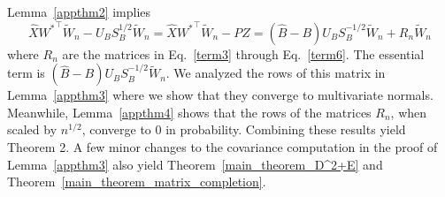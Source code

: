  Lemma~\ref{appthm2} implies
 $$\hat{X} {W^*}^{\top} \tilde{W}_n - U_B S_B^{1/2} \tilde{W}_n = \hat{X} {W^*}^{\top} \tilde{W}_n - PZ = (\hat{B} - B) U_B S_B^{-1/2} \tilde{W}_n + R_n \tilde{W}_n$$ where $R_n$ are the matrices in Eq.~\eqref{term3} through Eq.~\eqref{term6}. The essential term is $(\hat{B} - B) U_B S_B^{-1/2} \tilde{W}_n$. We analyzed the rows of this matrix in Lemma~\ref{appthm3} where we show that they converge to multivariate normals. Meanwhile, Lemma~\ref{appthm4} shows that the rows of the matrices $R_n$, when scaled by $n^{1/2}$, converge to $0$ in probability. Combining these results yield Theorem 2. A few minor changes to the covariance computation in the proof of Lemma~\ref{appthm3} also yield Theorem~\ref{main_theorem_D^2+E} and Theorem~\ref{main_theorem_matrix_completion}.


